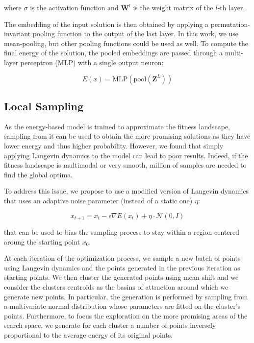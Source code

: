 where $\sigma$ is the activation function and $\mathbf{W}^{l}$ is the weight matrix of the $l$-th layer.

The embedding of the input solution is then obtained by applying a permutation-invariant pooling function to the output of the last layer. In this work, we use mean-pooling, but other pooling functions could be used as well. To compute the final energy of the solution, the pooled embeddings are passed through a multi-layer perceptron (MLP) with a single output neuron:

\begin{equation*}
    E(x) = \text{MLP}(\text{pool}(\mathbf{Z}^{L}))
\end{equation*}

\subsection*{Local Sampling}

As the energy-based model is trained to approximate the fitness landscape, sampling from it can be used to obtain the more promising solutions as they have lower energy and thus higher probability. However, we found that simply applying Langevin dynamics to the model can lead to poor results. Indeed, if the fitness landscape is multimodal or very smooth, million of samples are needed to find the global optima.

To address this issue, we propose to use a modified version of Langevin dynamics that uses an adaptive noise parameter (instead of a static one) $\eta$:

\begin{equation*}
    x_{t+1} = x_t - \epsilon \nabla E(x_t) + \eta \cdot \mathcal{N}(0, I)
\end{equation*}

that can be used to bias the sampling process to stay within a region centered aroung the starting point $x_0$.

At each iteration of the optimization process, we sample a new batch of points using Langevin dynamics and the points generated in the previous iteration as starting points. We then cluster the generated points using mean-shift and we consider the clusters centroids as the basins of attraction around which we generate new points. In particular, the generation is performed by sampling from a multivariate normal distribution whose parameters are fitted on the cluster's points. Furthermore, to focus the exploration on the more promising areas of the search space, we generate for each cluster a number of points inversely proportional to the average energy of its original points.

